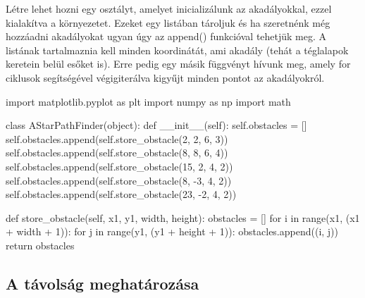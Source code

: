 Létre lehet hozni egy osztályt, amelyet inicializálunk az akadályokkal, ezzel kialakítva a környezetet. Ezeket egy listában tároljuk és ha szeretnénk még hozzáadni akadályokat ugyan úgy az append() funkcióval tehetjük meg. A listának tartalmaznia kell minden koordinátát, ami akadály (tehát a téglalapok keretein belül esőket is). Erre pedig egy másik függvényt hívunk meg, amely for ciklusok segítségével végigiterálva kigyűjt minden pontot az akadályokról. 

\begin{python}
import matplotlib.pyplot as plt
import numpy as np
import math


class AStarPathFinder(object):
    def __init__(self):
        self.obstacles = []
        self.obstacles.append(self.store_obstacle(2, 2, 6, 3))
        self.obstacles.append(self.store_obstacle(8, 8, 6, 4))
        self.obstacles.append(self.store_obstacle(15, 2, 4, 2))
        self.obstacles.append(self.store_obstacle(8, -3, 4, 2))
        self.obstacles.append(self.store_obstacle(23, -2, 4, 2))
        
 	def store_obstacle(self, x1, y1, width, height):
        obstacles = []
        for i in range(x1, (x1 + width + 1)):
            for j in range(y1, (y1 + height + 1)):
                obstacles.append((i, j))
        return obstacles
\end{python}

\subsection{A távolság meghatározása}


